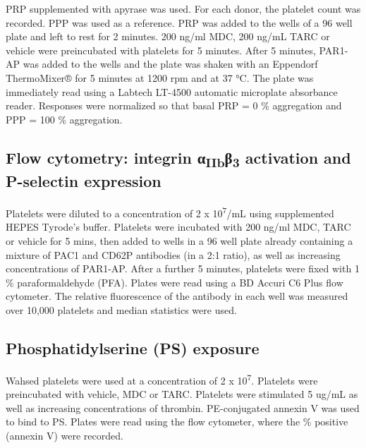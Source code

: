\documentclass[11pt,twoside]{bristolthesis}
\begin{document}
PRP supplemented with apyrase was used. For each donor, the platelet count was recorded. PPP was used as a reference. PRP was added to the wells of a 96 well plate and left to rest for 2 minutes. 200 ng/ml MDC, 200 ng/mL TARC or vehicle were preincubated with platelets for 5 minutes. After 5 minutes, PAR1-AP was added to the wells and the plate was shaken with an Eppendorf ThermoMixer® for 5 minutes at 1200 rpm and at 37 °C. The plate was immediately read using a Labtech LT-4500 automatic microplate absorbance reader. Responses were normalized so that basal PRP = 0 \% aggregation and PPP = 100 \% aggregation.

\hypertarget{flow-cytometry-integrin-ux3b1iibux3b23-activation-and-p-selectin-expression}{%
\subsection{\texorpdfstring{Flow cytometry: integrin α\textsubscript{IIb}β\textsubscript{3} activation and P-selectin expression}{Flow cytometry: integrin αIIbβ3 activation and P-selectin expression}}\label{flow-cytometry-integrin-ux3b1iibux3b23-activation-and-p-selectin-expression}}

Platelets were diluted to a concentration of 2 x 10\textsuperscript{7}/mL using supplemented HEPES Tyrode's buffer. Platelets were incubated with 200 ng/ml MDC, TARC or vehicle for 5 mins, then added to wells in a 96 well plate already containing a mixture of PAC1 and CD62P antibodies (in a 2:1 ratio), as well as increasing concentrations of PAR1-AP. After a further 5 minutes, platelets were fixed with 1 \% paraformaldehyde (PFA). Plates were read using a BD Accuri C6 Plus flow cytometer. The relative fluorescence of the antibody in each well was measured over 10,000 platelets and median statistics were used.

\hypertarget{phosphatidylserine-ps-exposure}{%
\subsection{Phosphatidylserine (PS) exposure}\label{phosphatidylserine-ps-exposure}}

Wahsed platelets were used at a concentration of 2 x 10\textsuperscript{7}. Platelets were preincubated with vehicle, MDC or TARC. Platelets were stimulated 5 ug/mL as well as increasing concentrations of thrombin. PE-conjugated annexin V was used to bind to PS. Plates were read using the flow cytometer, where the \% positive (annexin V) were recorded.
\end{document}
